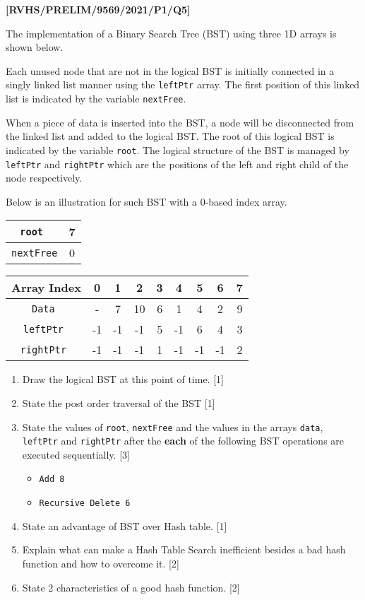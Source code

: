\item \textbf{{[}RVHS/PRELIM/9569/2021/P1/Q5{]} }

The implementation of a Binary Search Tree (BST) using three 1D arrays
is shown below. 

Each unused node that are not in the logical BST is initially connected
in a singly linked list manner using the \texttt{leftPtr} array. The
first position of this linked list is indicated by the variable \texttt{nextFree}. 

When a piece of data is inserted into the BST, a node will be disconnected
from the linked list and added to the logical BST. The root of this
logical BST is indicated by the variable \texttt{root}. The logical
structure of the BST is managed by \texttt{leftPtr} and \texttt{rightPtr}
which are the positions of the left and right child of the node respectively. 

Below is an illustration for such BST with a 0-based index array. 

\begin{tabular}{|c|c|}
\hline 
\texttt{root } & 7 \tabularnewline
\hline 
\texttt{nextFree} & 0\tabularnewline
\hline 
\end{tabular} 

\begin{tabular}{|c|c|c|c|c|c|c|c|c|}
\hline 
Array Index  & 0 & 1 & 2 & 3 & 4 & 5 & 6 & 7\tabularnewline
\hline 
\texttt{Data } & - & 7 & 10 & 6 & 1 & 4 & 2 & 9\tabularnewline
\hline 
\texttt{leftPtr } & -1 & -1 & -1 & 5 & -1 & 6 & 4 & 3\tabularnewline
\hline 
\texttt{rightPtr } & -1 & -1 & -1 & 1 & -1 & -1 & -1 & 2\tabularnewline
\hline 
\end{tabular}
\begin{enumerate}
\item Draw the logical BST at this point of time. \hfill{}{[}1{]}
\item State the post order traversal of the BST \hfill{}{[}1{]}
\item State the values of \texttt{root}, \texttt{nextFree} and the values
in the arrays \texttt{data}, \texttt{leftPtr} and \texttt{rightPtr}
after the \textbf{each} of the following BST operations are executed
sequentially. \hfill{}{[}3{]} 
\begin{itemize}
\item \texttt{Add 8}
\item \texttt{Recursive Delete 6 }
\end{itemize}
\item State an advantage of BST over Hash table. \hfill{}{[}1{]}
\item Explain what can make a Hash Table Search inefficient besides a bad
hash function and how to overcome it. \hfill{}{[}2{]}
\item State 2 characteristics of a good hash function. \hfill{}{[}2{]}
\end{enumerate}